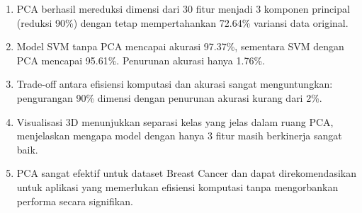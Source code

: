 \documentclass[12pt,a4paper]{article}
\begin{document}
\begin{enumerate}
    \item PCA berhasil mereduksi dimensi dari 30 fitur menjadi 3 komponen principal (reduksi 90\%) dengan tetap mempertahankan 72.64\% variansi data original.
    
    \item Model SVM tanpa PCA mencapai akurasi 97.37\%, sementara SVM dengan PCA mencapai 95.61\%. Penurunan akurasi hanya 1.76\%.
    
    \item Trade-off antara efisiensi komputasi dan akurasi sangat menguntungkan: pengurangan 90\% dimensi dengan penurunan akurasi kurang dari 2\%.
    
    \item Visualisasi 3D menunjukkan separasi kelas yang jelas dalam ruang PCA, menjelaskan mengapa model dengan hanya 3 fitur masih berkinerja sangat baik.
    
    \item PCA sangat efektif untuk dataset Breast Cancer dan dapat direkomendasikan untuk aplikasi yang memerlukan efisiensi komputasi tanpa mengorbankan performa secara signifikan.
\end{enumerate}
\end{document}
